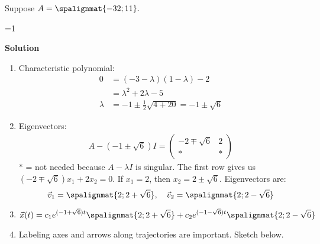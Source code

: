 \documentclass[12pt]{exam}
\newcommand{\sol}{1} %
\begin{document}
\begin{questions}
{\begin{enumerate}
        \end{enumerate}
        
        }
    \fi 
    
\newpage\Initials

\question[10] Suppose $A = \spalignmat{-3 2; 1 1}.$  %
 	
    
    
    \ifnum \sol=1
    {\color{DarkBlue} \textbf{Solution}
    
            \begin{enumerate}[label=(\alph*)]
        \item Characteristic polynomial: 
        \begin{align*}
            0 &= (-3 - \lambda) (1 - \lambda) - 2 \\
            &= \lambda^2 +2\lambda - 5 \\
            \lambda &= -1 \pm \frac12 \sqrt{4+20} = -1 \pm \sqrt{6}
        \end{align*}
        \item Eigenvectors: 
        \begin{align*}
            A - (-1 \pm \sqrt{6}) I = \begin{pmatrix} -2\mp\sqrt{6} & 2 \\ \ast & \ast \end{pmatrix}
        \end{align*}
        $\ast$ = not needed because $A-\lambda I$ is singular. The first row gives us $(-2 \mp \sqrt6)x_1 + 2x_2 = 0$. If $x_1 = 2$, then $x_2 = 2 \pm \sqrt6$. Eigenvectors are: 
        $$\vec v_1 = \spalignmat{2;2+\sqrt6}, \quad \vec v_2 = \spalignmat{2;2-\sqrt6}$$
        \item $\displaystyle \vec x(t) = c_1 e^{(-1+\sqrt6) t}\spalignmat{2;2+\sqrt6} + c_2e^{(-1-\sqrt6 )t}\spalignmat{2;2-\sqrt6} $
        \item Labeling axes and arrows along trajectories are important. Sketch below. 
        \end{enumerate}

}
\end{questions}
\end{document}
